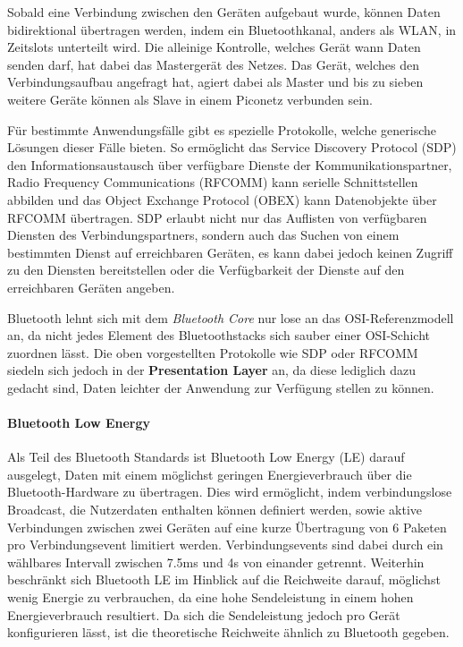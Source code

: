         Sobald eine Verbindung zwischen den Geräten aufgebaut wurde, können Daten bidirektional übertragen werden, indem ein Bluetoothkanal, anders als WLAN, in Zeitslots unterteilt wird.
        Die alleinige Kontrolle, welches Gerät wann Daten senden darf, hat dabei das Mastergerät des Netzes. Das Gerät, welches den Verbindungsaufbau angefragt hat,
        agiert dabei als Master und bis zu sieben weitere Geräte können als Slave in einem Piconetz verbunden sein.\cite[S.379f.]{AI-Sauter}

        Für bestimmte Anwendungsfälle gibt es spezielle Protokolle, welche generische Lösungen dieser Fälle bieten.
        So ermöglicht das Service Discovery Protocol (SDP) den Informationsaustausch über verfügbare Dienste der Kommunikationspartner,
        Radio Frequency Communications (RFCOMM) kann serielle Schnittstellen abbilden und das Object Exchange Protocol (OBEX) kann Datenobjekte über RFCOMM übertragen.\cite[S.229]{AI-Lueders}
        SDP erlaubt nicht nur das Auflisten von verfügbaren Diensten des Verbindungspartners, sondern auch das Suchen von einem bestimmten Dienst auf erreichbaren Geräten,
        es kann dabei jedoch keinen Zugriff zu den Diensten bereitstellen oder die Verfügbarkeit der Dienste auf den erreichbaren Geräten angeben.\cite[S.395f]{AI-Morrow}

        Bluetooth lehnt sich mit dem {\it Bluetooth Core} nur lose an das OSI-Referenzmodell an, da nicht jedes Element des Bluetoothstacks sich sauber einer OSI-Schicht zuordnen lässt.
        Die oben vorgestellten Protokolle wie SDP oder RFCOMM siedeln sich jedoch in der {\bf Presentation Layer} an, da diese lediglich dazu gedacht sind,
        Daten leichter der Anwendung zur Verfügung stellen zu können.\cite[S.382]{AI-Sauter}

        \paragraph{Bluetooth Low Energy}
        Als Teil des Bluetooth Standards ist Bluetooth Low Energy (LE) darauf ausgelegt, Daten mit einem möglichst geringen Energieverbrauch über die Bluetooth-Hardware zu übertragen.
        Dies wird ermöglicht, indem verbindungslose Broadcast, die Nutzerdaten enthalten können definiert werden, sowie aktive Verbindungen zwischen zwei Geräten auf eine kurze Übertragung von 6 Paketen pro Verbindungsevent limitiert werden. Verbindungsevents sind dabei durch ein wählbares Intervall zwischen 7.5ms und 4s von einander getrennt. Weiterhin beschränkt sich Bluetooth LE im Hinblick auf die Reichweite darauf, möglichst wenig Energie zu verbrauchen, da eine hohe Sendeleistung in einem hohen Energieverbrauch resultiert. Da sich die Sendeleistung jedoch pro Gerät konfigurieren lässt, ist die theoretische Reichweite ähnlich zu Bluetooth gegeben.\cite[S.7f.]{AI-Townsend}

